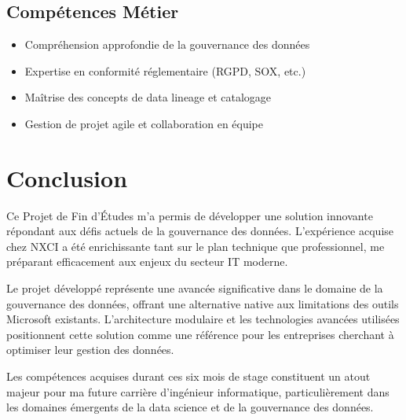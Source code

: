 \documentclass[12pt,a4paper]{article}
\begin{document}
\subsection{Compétences Métier}

\begin{itemize}
    \item Compréhension approfondie de la gouvernance des données
    \item Expertise en conformité réglementaire (RGPD, SOX, etc.)
    \item Maîtrise des concepts de data lineage et catalogage
    \item Gestion de projet agile et collaboration en équipe
\end{itemize}

\section{Conclusion}

Ce Projet de Fin d'Études m'a permis de développer une solution innovante répondant aux défis actuels de la gouvernance des données. L'expérience acquise chez NXCI a été enrichissante tant sur le plan technique que professionnel, me préparant efficacement aux enjeux du secteur IT moderne.

Le projet développé représente une avancée significative dans le domaine de la gouvernance des données, offrant une alternative native aux limitations des outils Microsoft existants. L'architecture modulaire et les technologies avancées utilisées positionnent cette solution comme une référence pour les entreprises cherchant à optimiser leur gestion des données.

Les compétences acquises durant ces six mois de stage constituent un atout majeur pour ma future carrière d'ingénieur informatique, particulièrement dans les domaines émergents de la data science et de la gouvernance des données.
\end{document}

